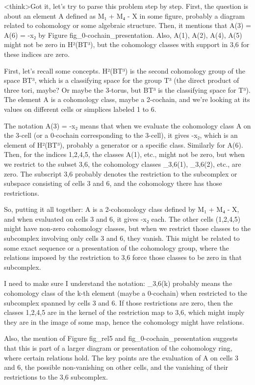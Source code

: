 <think>Got it, let's try to parse this problem step by step. First, the question is about an element A defined as M₁ + M₄ - X in some figure, probably a diagram related to cohomology or some algebraic structure. Then, it mentions that A(3) = A(6) = -x₂ by Figure fig_0-cochain_presentation. Also, A(1), A(2), A(4), A(5) might not be zero in H²(BT³), but the cohomology classes with support in {3,6} for these indices are zero. 

First, let's recall some concepts. H²(BT³) is the second cohomology group of the space BT³, which is a classifying space for the group T³ (the direct product of three tori, maybe? Or maybe the 3-torus, but BT³ is the classifying space for T³). The element A is a cohomology class, maybe a 2-cochain, and we're looking at its values on different cells or simplices labeled 1 to 6. 

The notation A(3) = -x₂ means that when we evaluate the cohomology class A on the 3-cell (or a 0-cochain corresponding to the 3-cell), it gives -x₂, which is an element of H²(BT³), probably a generator or a specific class. Similarly for A(6). Then, for the indices 1,2,4,5, the classes A(1), etc., might not be zero, but when we restrict to the subset {3,6}, the cohomology classes _{3,6}(1), _{3,6}(2), etc., are zero. The subscript {3,6} probably denotes the restriction to the subcomplex or subspace consisting of cells 3 and 6, and the cohomology there has those restrictions.

So, putting it all together: A is a 2-cohomology class defined by M₁ + M₄ - X, and when evaluated on cells 3 and 6, it gives -x₂ each. The other cells (1,2,4,5) might have non-zero cohomology classes, but when we restrict those classes to the subcomplex involving only cells 3 and 6, they vanish. This might be related to some exact sequence or a presentation of the cohomology group, where the relations imposed by the restriction to {3,6} force those classes to be zero in that subcomplex.

I need to make sure I understand the notation: _{3,6}(k) probably means the cohomology class of the k-th element (maybe a 0-cochain) when restricted to the subcomplex spanned by cells 3 and 6. If those restrictions are zero, then the classes 1,2,4,5 are in the kernel of the restriction map to {3,6}, which might imply they are in the image of some map, hence the cohomology might have relations.

Also, the mention of Figure fig_rel5 and fig_0-cochain_presentation suggests that this is part of a larger diagram or presentation of the cohomology ring, where certain relations hold. The key points are the evaluation of A on cells 3 and 6, the possible non-vanishing on other cells, and the vanishing of their restrictions to the {3,6} subcomplex.

